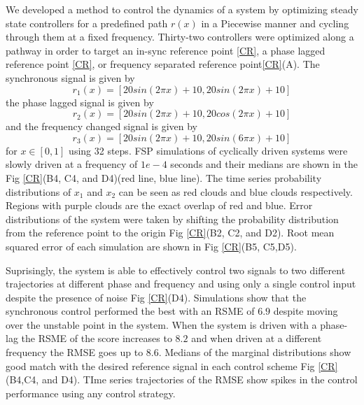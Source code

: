 \documentclass[12pt]{article}
\begin{document}
We developed a method to control the dynamics of a system by optimizing steady state controllers for a predefined path $r(x)$ in a Piecewise manner and cycling through them at a fixed frequency. Thirty-two controllers were optimized along a pathway in order to target an in-sync reference point \ref{CR}, a phase lagged reference point \ref{CR}, or frequency separated reference point\ref{CR}(A). The synchronous signal is given by
\begin{equation}
 r_1(x)=[20 sin(2 \pi x)+10, 20 sin(2 \pi x)+10]
\end{equation}
the phase lagged signal is given by
\begin{equation}
 r_2(x)=[20 sin(2 \pi x)+10, 20 cos(2 \pi x)+10]
\end{equation}
and the frequency changed signal is given by
\begin{equation}
 r_3(x)=[20 sin(2 \pi x)+10, 20 sin(6 \pi x)+10]
\end{equation}
for $x\in[0,1]$ using 32 steps. FSP simulations of cyclically driven systems were slowly driven at a frequency of $1e-4$ seconds and their medians are shown in the Fig \ref{CR}(B4, C4, and D4)(red line, blue line). The time series probability distributions of $x_1$ and $x_2$ can be seen as red clouds and blue clouds respectively. Regions with purple clouds are the exact overlap of red and blue. Error distributions of the system were taken by shifting the probability distribution from the reference point to the origin Fig \ref{CR}(B2, C2, and D2). Root mean squared error of each simulation are shown in Fig \ref{CR}(B5, C5,D5). 

Suprisingly, the system is able to effectively control two signals to two different trajectories at different phase and frequency and using only a single control input despite the presence of noise Fig \ref{CR}(D4).   Simulations show that the synchronous control performed the best with an RSME of $6.9$ despite moving over the unstable point in the system. When the system is driven with a phase-lag the RSME of the score increases to $8.2$ and when driven at a different frequency the RMSE goes up to $8.6$.  Medians of the marginal distributions show good match with the desired reference signal in each control scheme Fig \ref{CR}(B4,C4, and D4). TIme series trajectories of the RMSE show spikes in the control performance using any control strategy.
\end{document}
